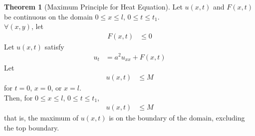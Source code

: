 \documentclass[titlepage, fleqn, a4paper, 12pt, twoside]{article}
\theoremstyle{definition}
\theoremstyle{theorem}
\newtheorem{theorem}{Theorem}
\begin{document}
\begin{theorem}[Maximum Principle for Heat Equation]
	Let $u(x,t)$ and $F(x,t)$ be continuous on the domain $0 \le x \le l$, $0 \le t \le t_1$.\\
	$\forall (x,y)$, let
	\begin{align*}
		F(x,t) & \le 0
	\end{align*}
	Let $u(x,t)$ satisfy
	\begin{align*}
		u_t & = a^2 u_{x x} + F(x,t)
	\end{align*}
	Let
	\begin{align*}
		u(x,t) & \le M
	\end{align*}
	for $t = 0$, $x = 0$, or $x = l$.\\
	Then, for $0 \le x \le l$, $0 \le t \le t_1$,
	\begin{align*}
		u(x,t) & \le M
	\end{align*}
	that is, the maximum of $u(x,t)$ is on the boundary of the domain, excluding the top boundary.
	\label{thm:Maximum_Principle_for_Heat_Equation}
\end{theorem}
\end{document}

